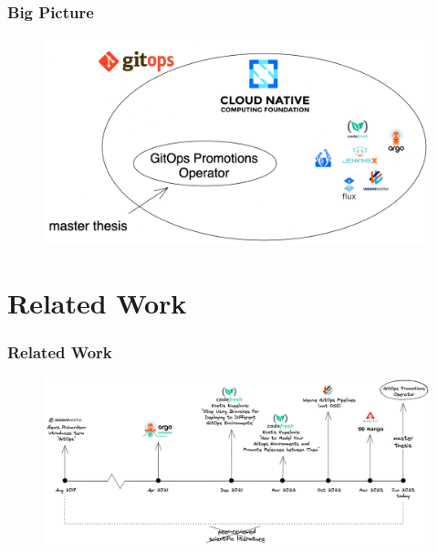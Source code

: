 \documentclass{beamer}
\begin{document}
\begin{frame}
\frametitle{Big Picture}

\begin{figure}[h]
	\centering
	\includegraphics[width=1.00\linewidth]{assets/big-picture-release-promotion-operator-cncf-gitops.png}
	\label{fig:bigPictureReleasePromotionOperatorCncfGitops}	
\end{figure}

%
%
%

\end{frame}


\section{Related Work}

\begin{frame}
\frametitle{Related Work}

\begin{figure}[h]
	\centering
	\includegraphics[width=1.0\linewidth]{assets/related-work-timeline-2017-2023-gitops.png}
	\label{fig:relatedWorkTimeline20172023gitops}	
\end{figure}

\end{frame}
\end{document}

